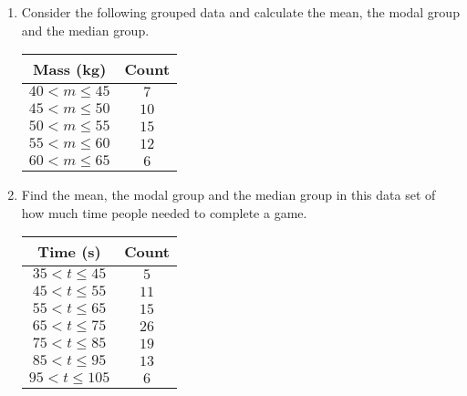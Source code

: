 \begin{exercises}{}{
  \begin{enumerate}[itemsep=8pt, label=\textbf{\arabic*}.]

  \item Consider the following grouped data and calculate the mean,
    the modal group and the median group.
\\
    \begin{center}
      \begin{tabular}{|c|c|}\hline
      
        \textbf{Mass (kg)} & \textbf{Count} \\\hline
     
        $40 < m \leq 45$ & $7$ \\\hline
        $45 < m \leq 50$ & $10$ \\\hline
        $50 < m \leq 55$ & $15$ \\\hline
        $55 < m \leq 60$ & $12$ \\\hline
        $60 < m \leq 65$ & $6$ \\\hline
  
      \end{tabular}
    \end{center}

  \item Find the mean, the modal group and the median group in this
    data set of how much time people needed to complete a game.
\\
    \begin{center}
      \begin{tabular}{|c|c|} \hline

       \textbf{Time (s)} & \textbf{Count} \\ \hline

        $35 < t \leq 45$ & $5$ \\\hline
        $45 < t \leq 55$ & $11$ \\\hline
        $55 < t \leq 65$ & $15$ \\\hline
        $65 < t \leq 75$ & $26$ \\\hline
        $75 < t \leq 85$ & $19$ \\\hline
        $85 < t \leq 95$ & $13$ \\\hline
        $95 < t \leq 105$ & $6$ \\\hline


\end{tabular}
\end{center}
\end{enumerate}}
\end{exercises}
